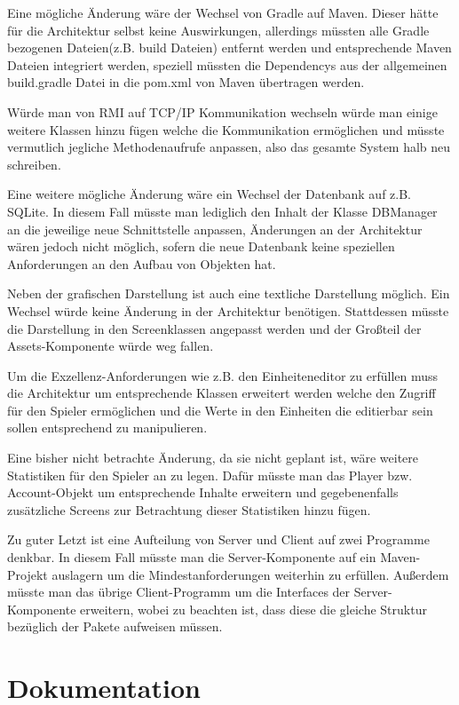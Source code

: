 \documentclass[fontsize=12pt,paper=a4,twoside]{scrartcl}
\begin{document}
\label{sec:evolution}

Eine mögliche Änderung wäre der Wechsel von Gradle auf Maven. Dieser hätte für die Architektur selbst keine Auswirkungen, allerdings müssten alle Gradle bezogenen Dateien(z.B. build Dateien) entfernt werden und entsprechende Maven Dateien integriert werden, speziell müssten die Dependencys aus der allgemeinen build.gradle Datei in die pom.xml von Maven übertragen werden.

Würde man von RMI auf TCP/IP Kommunikation wechseln würde man einige weitere Klassen hinzu fügen welche die Kommunikation ermöglichen und müsste vermutlich jegliche Methodenaufrufe anpassen, also das gesamte System halb neu schreiben.

Eine weitere mögliche Änderung wäre ein Wechsel der Datenbank auf z.B. SQLite. In diesem Fall müsste man lediglich den Inhalt der Klasse DBManager an die jeweilige neue Schnittstelle anpassen, Änderungen an der Architektur wären jedoch nicht möglich, sofern die neue Datenbank keine speziellen Anforderungen an den Aufbau von Objekten hat.

Neben der grafischen Darstellung ist auch eine textliche Darstellung möglich. Ein Wechsel würde keine Änderung in der Architektur benötigen. Stattdessen müsste die Darstellung in den Screenklassen angepasst werden und der Großteil der Assets-Komponente würde weg fallen.

Um die Exzellenz-Anforderungen wie z.B. den Einheiteneditor zu erfüllen muss die Architektur um entsprechende Klassen erweitert werden welche den Zugriff für den Spieler ermöglichen und die Werte in den Einheiten die editierbar sein sollen entsprechend zu manipulieren.

Eine bisher nicht betrachte Änderung, da sie nicht geplant ist, wäre weitere Statistiken für den Spieler an zu legen. Dafür müsste man das Player bzw. Account-Objekt um entsprechende Inhalte erweitern und gegebenenfalls zusätzliche Screens zur Betrachtung dieser Statistiken hinzu fügen.

Zu guter Letzt ist eine Aufteilung von Server und Client auf zwei Programme denkbar. In diesem Fall müsste man die Server-Komponente auf ein Maven-Projekt auslagern um die Mindestanforderungen weiterhin zu erfüllen. Außerdem müsste man das übrige Client-Programm um die Interfaces der Server-Komponente erweitern, wobei zu beachten ist, dass diese die gleiche Struktur bezüglich der Pakete aufweisen müssen.

\section{Dokumentation}
\end{document}
